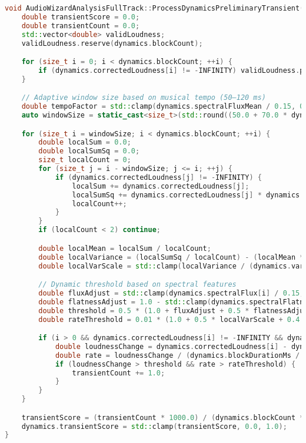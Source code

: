 \documentclass[11pt]{article}
\begin{document}
\begin{lstlisting}[language=C++]
void AudioWizardAnalysisFullTrack::ProcessDynamicsPreliminaryTransient(FullTrackDataDynamics& dynamics) {
	double transientScore = 0.0;
	double transientCount = 0.0;
	std::vector<double> validLoudness;
	validLoudness.reserve(dynamics.blockCount);

	for (size_t i = 0; i < dynamics.blockCount; ++i) {
		if (dynamics.correctedLoudness[i] != -INFINITY) validLoudness.push_back(dynamics.correctedLoudness[i]);
	}

	// Adaptive window size based on musical tempo (50–120 ms)
	double tempoFactor = std::clamp(dynamics.spectralFluxMean / 0.15, 0.5, 1.5);
	auto windowSize = static_cast<size_t>(std::round((50.0 + 70.0 * dynamics.genreFactor) / dynamics.blockDurationMs * tempoFactor));

	for (size_t i = windowSize; i < dynamics.blockCount; ++i) {
		double localSum = 0.0;
		double localSumSq = 0.0;
		size_t localCount = 0;
		for (size_t j = i - windowSize; j <= i; ++j) {
			if (dynamics.correctedLoudness[j] != -INFINITY) {
				localSum += dynamics.correctedLoudness[j];
				localSumSq += dynamics.correctedLoudness[j] * dynamics.correctedLoudness[j];
				localCount++;
			}
		}
		if (localCount < 2) continue;

		double localMean = localSum / localCount;
		double localVariance = (localSumSq / localCount) - (localMean * localMean);
		double localVarScale = std::clamp(localVariance / (dynamics.variance + 1e-12), 0.0, 2.0);

		// Dynamic threshold based on spectral features
		double fluxAdjust = std::clamp(dynamics.spectralFlux[i] / 0.15, 0.0, 1.5);
		double flatnessAdjust = 1.0 - std::clamp(dynamics.spectralFlatness[i], 0.0, 1.0);
		double threshold = 0.5 * (1.0 + fluxAdjust + 0.5 * flatnessAdjust); // 0.5–2.0 dB
		double rateThreshold = 0.01 * (1.0 + 0.5 * localVarScale + 0.4 * fluxAdjust);

		if (i > 0 && dynamics.correctedLoudness[i] != -INFINITY && dynamics.correctedLoudness[i - 1] != -INFINITY) {
			double loudnessChange = dynamics.correctedLoudness[i] - dynamics.correctedLoudness[i - 1];
			double rate = loudnessChange / (dynamics.blockDurationMs / 1000.0);
			if (loudnessChange > threshold && rate > rateThreshold) {
				transientCount += 1.0;
			}
		}
	}

	transientScore = (transientCount * 1000.0) / (dynamics.blockCount * dynamics.blockDurationMs + 1e-12) / 10.0;
	dynamics.transientScore = std::clamp(transientScore, 0.0, 1.0);
}
\end{lstlisting}
\end{document}
